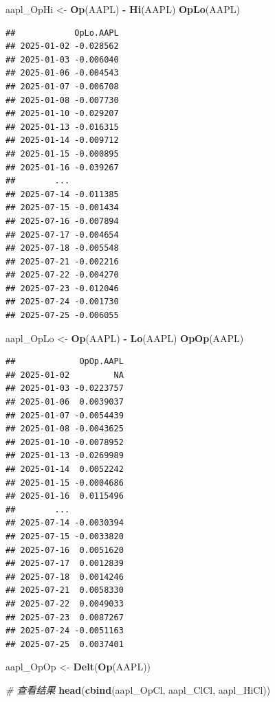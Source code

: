 \documentclass[]{ctexbook}
\newenvironment{Shaded}{\begin{snugshade}}{\end{snugshade}}
\newcommand{\CommentTok}[1]{\textcolor[rgb]{0.56,0.35,0.01}{\textit{#1}}}
\newcommand{\FunctionTok}[1]{\textcolor[rgb]{0.13,0.29,0.53}{\textbf{#1}}}
\newcommand{\NormalTok}[1]{#1}
\newcommand{\OtherTok}[1]{\textcolor[rgb]{0.56,0.35,0.01}{#1}}
\newcommand{\SpecialCharTok}[1]{\textcolor[rgb]{0.81,0.36,0.00}{\textbf{#1}}}
\begin{document}
\begin{Shaded}
\begin{Highlighting}[]
\NormalTok{aapl\_OpHi }\OtherTok{\textless{}{-}} \FunctionTok{Op}\NormalTok{(AAPL) }\SpecialCharTok{{-}} \FunctionTok{Hi}\NormalTok{(AAPL)}
\FunctionTok{OpLo}\NormalTok{(AAPL)}
\end{Highlighting}
\end{Shaded}

\begin{verbatim}
##            OpLo.AAPL
## 2025-01-02 -0.028562
## 2025-01-03 -0.006040
## 2025-01-06 -0.004543
## 2025-01-07 -0.006708
## 2025-01-08 -0.007730
## 2025-01-10 -0.029207
## 2025-01-13 -0.016315
## 2025-01-14 -0.009712
## 2025-01-15 -0.000895
## 2025-01-16 -0.039267
##        ...          
## 2025-07-14 -0.011385
## 2025-07-15 -0.001434
## 2025-07-16 -0.007894
## 2025-07-17 -0.004654
## 2025-07-18 -0.005548
## 2025-07-21 -0.002216
## 2025-07-22 -0.004270
## 2025-07-23 -0.012046
## 2025-07-24 -0.001730
## 2025-07-25 -0.006055
\end{verbatim}

\begin{Shaded}
\begin{Highlighting}[]
\NormalTok{aapl\_OpLo }\OtherTok{\textless{}{-}} \FunctionTok{Op}\NormalTok{(AAPL) }\SpecialCharTok{{-}} \FunctionTok{Lo}\NormalTok{(AAPL)}
\FunctionTok{OpOp}\NormalTok{(AAPL)}
\end{Highlighting}
\end{Shaded}

\begin{verbatim}
##             OpOp.AAPL
## 2025-01-02         NA
## 2025-01-03 -0.0223757
## 2025-01-06  0.0039037
## 2025-01-07 -0.0054439
## 2025-01-08 -0.0043625
## 2025-01-10 -0.0078952
## 2025-01-13 -0.0269989
## 2025-01-14  0.0052242
## 2025-01-15 -0.0004686
## 2025-01-16  0.0115496
##        ...           
## 2025-07-14 -0.0030394
## 2025-07-15 -0.0033820
## 2025-07-16  0.0051620
## 2025-07-17  0.0012839
## 2025-07-18  0.0014246
## 2025-07-21  0.0058330
## 2025-07-22  0.0049033
## 2025-07-23  0.0087267
## 2025-07-24 -0.0051163
## 2025-07-25  0.0037401
\end{verbatim}

\begin{Shaded}
\begin{Highlighting}[]
\NormalTok{aapl\_OpOp }\OtherTok{\textless{}{-}} \FunctionTok{Delt}\NormalTok{(}\FunctionTok{Op}\NormalTok{(AAPL))}

\CommentTok{\# 查看结果}
\FunctionTok{head}\NormalTok{(}\FunctionTok{cbind}\NormalTok{(aapl\_OpCl, aapl\_ClCl, aapl\_HiCl))}
\end{Highlighting}
\end{Shaded}
\end{document}
